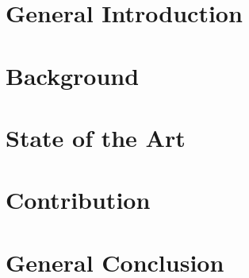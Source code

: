 \documentclass[12pt,a4paper,oneside]{report}
\title{\ThesisTitle}
\author{\StudentName}
\begin{document}
\hypersetup{pageanchor=false}

\clearpage
\hypersetup{pageanchor=true}






\tableofcontents
\listoffigures
\listoftables


\clearpage
{}

\part{General Introduction}


\part{Background}



\part{State of the Art}


\part{Contribution}



\part{General Conclusion}


\appendix


\printbibliography[heading=bibintoc]
\end{document}
